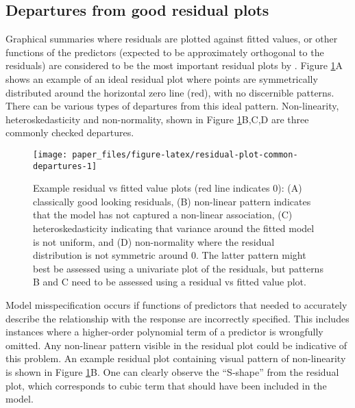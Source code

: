 \documentclass[]{interact}
\theoremstyle{plain}%
\theoremstyle{definition}
\theoremstyle{remark}
\begin{document}
\hypertarget{departures-from-good-residual-plots}{%
\subsection{Departures from good residual
plots}\label{departures-from-good-residual-plots}}

Graphical summaries where residuals are plotted against fitted values,
or other functions of the predictors (expected to be approximately
orthogonal to the residuals) are considered to be the most important
residual plots by \citet{cook1999applied}. Figure
\ref{fig:residual-plot-common-departures}A shows an example of an ideal
residual plot where points are symmetrically distributed around the
horizontal zero line (red), with no discernible patterns. There can be
various types of departures from this ideal pattern. Non-linearity,
heteroskedasticity and non-normality, shown in Figure
\ref{fig:residual-plot-common-departures}B,C,D are three commonly
checked departures.

\begin{figure}[t!]

{\centering \texttt{[image: paper\_files/figure-latex/residual-plot-common-departures-1]} 

}

\caption{Example residual vs fitted value plots (red line indicates 0): (A) classically good looking residuals, (B) non-linear pattern indicates that the model has not captured a non-linear association, (C) heteroskedasticity indicating that variance around the fitted model is not uniform, and (D) non-normality where the residual distribution is not symmetric around 0. The latter pattern might best be assessed using a univariate plot of the residuals, but patterns B and C need to be assessed using a residual vs fitted value plot.}\label{fig:residual-plot-common-departures}
\end{figure}

Model misspecification occurs if functions of predictors that needed to
accurately describe the relationship with the response are incorrectly
specified. This includes instances where a higher-order polynomial term
of a predictor is wrongfully omitted. Any non-linear pattern visible in
the residual plot could be indicative of this problem. An example
residual plot containing visual pattern of non-linearity is shown in
Figure \ref{fig:residual-plot-common-departures}B. One can clearly
observe the ``S-shape'' from the residual plot, which corresponds to
cubic term that should have been included in the model.
\end{document}
